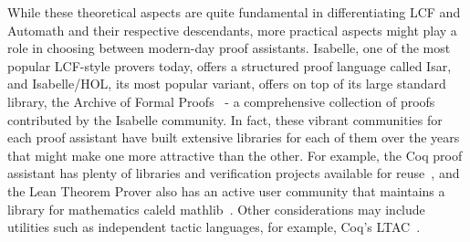 \documentclass{article}
\begin{document}
	While these theoretical aspects 
	are quite fundamental in 
	differentiating LCF and Automath 
	and their respective descendants, 
	more practical aspects might 
	play a role in choosing between 
	modern-day proof assistants. 
	Isabelle, one of the most 
	popular LCF-style provers today,
	offers a structured proof language
	called Isar, and Isabelle/HOL, 
	its most popular variant,
	offers on top of its large 
	standard library, the Archive
	of Formal Proofs~\cite{afp} - a 
	comprehensive collection of 
	proofs contributed by the 
	Isabelle community. In fact, 
	these vibrant communities for 
	each proof assistant have 
	built extensive libraries 
	for each of them over the years 
	that might make one more 
	attractive than the other. For 
	example, the Coq proof assistant
	has plenty of libraries and 
	verification projects available 
	for reuse~\cite{coqlib}, and 
	the Lean Theorem Prover also has 
	an active user community that 
	maintains a library for 
	mathematics caleld 
	mathlib~\cite{10.1145/3372885.3373824}.
	Other considerations may 
	include utilities such as 
	independent tactic languages, 
	for example, Coq's 
	LTAC~\cite{10.1007/3-540-44404-1_7}.
	
  	


\end{document}
